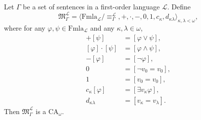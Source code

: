 Let $\Gamma$ be a set of sentences in a first-order language $\mathcal{L}$. Define
$$\mathfrak{M}_{\Gamma}^{\mathcal{L}} = \langle \mathrm{Fmla}_{\mathcal{L}} / {\equiv_{\Gamma}^{\mathcal{L}}}, +, \cdot, -, 0, 1, c_{\kappa}, d_{\kappa\lambda} \rangle_{\kappa,\lambda < \omega},$$
where for any $\varphi, \psi \in \mathrm{Fmla}_{\mathcal{L}}$ and any $\kappa, \lambda \in \omega$,
\begin{align*}
[\varphi] + [\psi] &= [\varphi \vee \psi],\\
[\varphi] \cdot [\psi] &= [\varphi \wedge \psi],\\
-[\varphi] &= [\neg \varphi],\\
0 &= [\neg v_0 = v_0],\\
1 &= [v_0 = v_0],\\
c_{\kappa}[\varphi] &= [\exists v_{\kappa} \varphi],\\
d_{\kappa\lambda} &= [v_{\kappa} = v_{\lambda}].
\end{align*}
Then $\mathfrak{M}_{\Gamma}^{\mathcal{L}}$ is a $\mathrm{CA}_{\omega}$.
